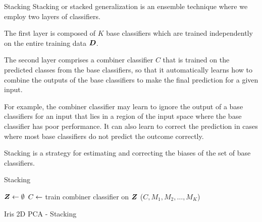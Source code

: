 {\begin{frame}{Stacking}
Stacking or stacked generalization is an ensemble technique where we employ two
layers of classifiers. 

\medskip

The first layer is composed of $K$ base classifiers
which are trained independently on the entire training data ${\boldsymbol D}$.

\medskip

The second layer comprises a combiner classifier $C$ that is trained on the
predicted classes from the base classifiers, so that it automatically 
learns how to combine the outputs of the base classifiers to make the
final prediction for a given input. 

\medskip

For example, the combiner classifier
may learn to ignore the output of a base classifiers for an input that
lies in a region of the input space where the base classifier has poor
performance. 
It can also learn to
correct the prediction in cases where most base classifiers do not
predict the outcome correctly. 

\medskip

Stacking is a strategy
for estimating and correcting the biases of the set of base classifiers.
\end{frame}

\begin{frame}[fragile]{Stacking}

 
\newcommand{\algStacking}{\textsc{Stacking}}
\begin{tightalgo}[H]{\textwidth-18pt} 
\SetKwInOut{Algorithm}{\algStacking ($K, \bM, C, \bD$)} 
\Algorithm{} 
${\boldsymbol Z} \leftarrow \emptyset$\; 
\label{alg:class:ensemble:stacking:traincombstart} 
$C \leftarrow $ train combiner classifier on ${\boldsymbol Z}$\;
\label{alg:class:ensemble:stacking:traincombend} 
\Return($C, M_1, M_2, \ldots, M_K$)\; 
\end{tightalgo}
\end{frame}



\begin{frame}{Iris 2D PCA - Stacking}
    

\end{frame}}
